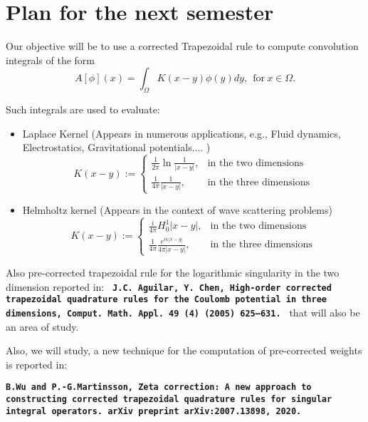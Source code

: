\documentclass[../document.tex]{subfiles}
\begin{document}
	\chapter{Plan for the next semester}
	Our objective will be to use a corrected Trapezoidal rule to compute convolution integrals of the form
	$$
	A[\phi](x) = \int_{\Omega}K(x-y)\phi(y)dy, \ \ \text{for} \  x\in \Omega.	
	$$
	
	Such integrals are used to evaluate:
	
	\begin{itemize}
		\item {Laplace Kernel} (Appears in numerous applications, e.g., Fluid dynamics, Electrostatics, Gravitational potentials....   )
		$$
		K(x-y):=\left\{\begin{array}{ll}
			\frac{1}{2 \pi} \ln \frac{1}{|x-y|}, & \text{in the two dimensions} \\
			\frac{1}{4 \pi} \frac{1}{|x-y|}, & \text{in the three dimensions} 
		\end{array}\right.
		$$
		
		\item {Helmholtz kernel} (Appears in the context of wave scattering problems)
		$$
		K(x-y):=\left\{\begin{array}{ll}
			\frac{i}{4 \pi} H^{1}_{0}|x-y|, & \text{in the two dimensions} \\
			\frac{1}{4 \pi} \frac{e^{i\kappa|x-y|}}{4\pi |x-y|}, & \text{in the three dimensions} 
		\end{array}\right.
		$$
	\end{itemize}
	
	
	\vspace{5mm} %
	Also pre-corrected trapezoidal rule for the logarithmic singularity in the two dimension reported in:\newline
	\texttt{\textbf{
			J.C. Aguilar, Y. Chen, High-order corrected trapezoidal quadrature rules for the Coulomb potential in three dimensions, Comput. Math. Appl. 49 (4) (2005) 625–631.
	}}\newline
	that will also be an area of study.
	\vspace{5mm} %
	
	
	Also, we will study, a new technique for the computation of pre-corrected weights is reported in: 
	
	\texttt{\textbf{B.Wu and P.-G.Martinsson,
			Zeta correction: A new approach to constructing corrected trapezoidal quadrature rules for singular integral operators.
			arXiv preprint arXiv:2007.13898, 2020.
	}}
	
	
	
\end{document}

